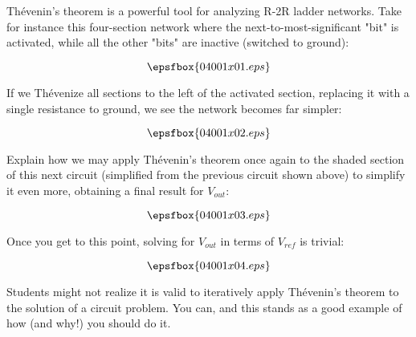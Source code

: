 

Th\'evenin's theorem is a powerful tool for analyzing R-2R ladder networks.  Take for instance this four-section network where the next-to-most-significant "bit" is activated, while all the other "bits" are inactive (switched to ground):

$$\epsfbox{04001x01.eps}$$

If we Th\'evenize all sections to the left of the activated section, replacing it with a single resistance to ground, we see the network becomes far simpler:

$$\epsfbox{04001x02.eps}$$

\goodbreak
Explain how we may apply Th\'evenin's theorem once again to the shaded section of this next circuit (simplified from the previous circuit shown above) to simplify it even more, obtaining a final result for $V_{out}$:

$$\epsfbox{04001x03.eps}$$







Once you get to this point, solving for $V_{out}$ in terms of $V_{ref}$ is trivial:

$$\epsfbox{04001x04.eps}$$







Students might not realize it is valid to iteratively apply Th\'evenin's theorem to the solution of a circuit problem.  You can, and this stands as a good example of how (and why!) you should do it.




